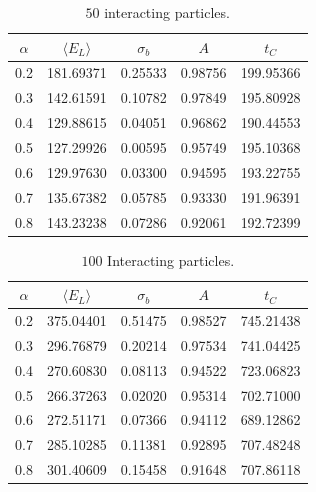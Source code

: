\documentclass[
    a4paper, aps, twocolumn, floatfix, superscriptaddress, nofootinbib]{revtex4-1}
\newcommand{\1}{\mathds{1}}
\begin{document}
         \begin{table}
             \caption{$50$ interacting particles.}
             \centering
             \begin{ruledtabular}
                 \begin{tabular}{ccccc}
                     $\alpha$ & $\langle  E_L\rangle$ & $\sigma_b$
                     &$A$&$t_C$ \\
                     \hline
                     0.2&181.69371&0.25533&0.98756&199.95366\\
                     0.3&142.61591&0.10782&0.97849&195.80928\\
                     0.4&129.88615&0.04051&0.96862&190.44553\\
                     0.5&127.29926&0.00595&0.95749&195.10368\\
                     0.6&129.97630&0.03300&0.94595&193.22755\\
                     0.7&135.67382&0.05785&0.93330&191.96391\\
                     0.8&143.23238&0.07286&0.92061&192.72399\\
                 \end{tabular}
             \end{ruledtabular}
             \label{tab:50_interacting}
         \end{table}
 
         \begin{table}
             \caption{$100$ Interacting particles.}
             \centering
             \begin{ruledtabular}
                 \begin{tabular}{ccccc}
                     $\alpha$ & $\langle  E_L\rangle$ & $\sigma_b$
                     &$A$&$t_C$ \\
                     \hline
                     0.2&375.04401&0.51475&0.98527&745.21438\\
                     0.3&296.76879&0.20214&0.97534&741.04425\\
                     0.4&270.60830&0.08113&0.94522&723.06823\\
                     0.5&266.37263&0.02020&0.95314&702.71000\\
                     0.6&272.51171&0.07366&0.94112&689.12862\\
                     0.7&285.10285&0.11381&0.92895&707.48248\\
                     0.8&301.40609&0.15458&0.91648&707.86118\\
                 \end{tabular}
             \end{ruledtabular}
             \label{tab:100_interacting}
         \end{table}
 
\end{document}
